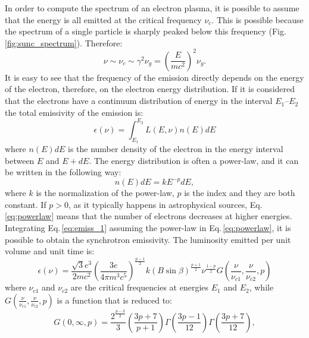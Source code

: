 \documentclass[../main.tex]{subfiles}
\begin{document}
In order to compute the spectrum of an electron plasma, it is possible to assume that the energy is all emitted at the critical frequency $\nu_c$. 
This is possible because the spectrum of a single particle is sharply peaked below this frequency (Fig.\,\ref{fig:sunc_spectrum}).
Therefore:
\begin{equation}
    \label{eq: new_crit_freq}
    \nu \sim \nu_c\sim \gamma^2 \nu_g = \left(\frac{E}{mc^2}\right)^2\nu_g.
\end{equation}
It is easy to see that the frequency of the emission directly depends on the energy of the electron, therefore, on the electron energy distribution.
If it is considered that the electrons have a continuum distribution of energy in the interval $E_1$--$E_2$ the total emissivity of the emission is:
\begin{equation}
    \label{eq:emiss_1}
    \epsilon(\nu) = \int_{E_1}^{E_2} L(E,\nu) n(E)dE
\end{equation}
where $n(E)dE$ is the number density of the electron in the energy interval between $E$ and $E+dE$.
The energy distribution is often a power-law, and it can be written in the following way:
\begin{equation}
    \label{eq:powerlaw}
    n(E)dE=kE^{-p}dE,
\end{equation}
where $k$ is the normalization of the power-law, $p$ is the index and they are both constant.
If $p>0$, as it typically happens in astrophysical sources, Eq.\,\ref{eq:powerlaw} means that the number of electrons decreases at higher energies.
Integrating Eq.\,\ref{eq:emiss_1} assuming the power-law in Eq.\,\ref{eq:powerlaw}, it is possible to obtain the synchrotron emissivity. 
The luminosity emitted per unit volume and unit time is:
\begin{equation}
    \label{eq:emiss_2}
    \epsilon(\nu)=\frac{\sqrt{3}e^3}{2mc^2}\left(\frac{3e}{4\pi m^3 c^5}\right)^{\frac{p-1}{2}}k\left(B\sin\beta\right)^{\frac{p+1}{2}}\nu^{\frac{1-p}{2}}G\left(\frac{\nu}{\nu_{c1}},\frac{\nu}{\nu_{c2}},p\right)
\end{equation}
where $\nu_{c1}$ and $\nu_{c2}$ are the critical frequencies at energies $E_1$ and $E_2$, while $G\left(\frac{\nu}{\nu_{c1}},\frac{\nu}{\nu_{c2}},p\right)$ is a function that is reduced to:
\begin{equation}
    \label{eq:G}
    G\left(0,\infty,p\right) = \frac{2^{\frac{p-3}{2}}}{3}\left(\frac{3p+7}{p+1}\right)\Gamma\left(\frac{3p-1}{12}\right)\Gamma\left(\frac{3p+7}{12}\right),
\end{equation}
\end{document}

